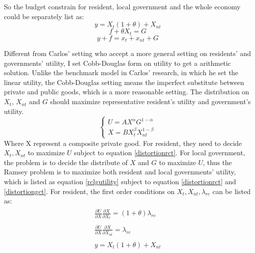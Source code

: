 So the budget constrain for resident, local government and the whole economy could be separately list as:
\begin{equation} \label{distortionrct}
    y=X_t(1+\theta)+X_{n t}
\end{equation}
\begin{equation} \label{distortiongct}
    f+\theta X_t=G
\end{equation}
\begin{equation} \label{distortionect}
    y+f=x_t+x_{nt}+G
\end{equation}

Different from Carlos' setting who accept a more general setting on residents' and governments' utility, I set Cobb-Douglas form on utility to get a arithmetic solution. Unlike the benchmark model in Carlos' research, in which he set the linear utility, the Cobb-Douglas setting means the imperfect substitute between private and public goods, which is a more reasonable setting. The distribution on $X_t$, $X_{nt}$ and $G$ should maximize representative resident's utility and government's utility.
\begin{equation} \label{rclgutility}
    \left\{\begin{array}{l}U=A X^\alpha G^{1-\alpha} \\ X=B X_t^\beta X_{n t}^{1-\beta}\end{array}\right.
\end{equation}
Where X represent a composite private good.
For resident, they need to decide $X_t, X_{nt}$ to maximize $U$ subject to equation \ref{distortionrct}. For local government, the problem is to decide the distribute of $X$ and $G$ to maximize $U$, thus the Ramsey problem is to maximize both resident and local governments' utility, which is listed as equation \ref*{rclgutility} subject to equation \ref{distortionrct} and \ref{distortiongct}. For resident, the first order conditions on $X_t, X_{nt}, \lambda_{rc}$ can be listed as:
\begin{align}
    \begin{split}
        \frac{\partial U}{\partial X} \frac{\partial X}{\partial X_t}=(1+\theta) \lambda_{r c} \label{focxt}
    \end{split}                     \\
    \begin{split}
        \frac{\partial U}{\partial X} \frac{\partial X}{\partial X_{nt}}=\lambda_{r c} \label{focxnt}
    \end{split} \\
    \begin{split}
        y=X_t(1+\theta)+X_{nt} \label{foclabrc}
    \end{split}
\end{align}
